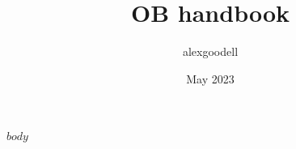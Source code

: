 \documentclass[twoside,8pt]{extarticle}
\title{OB handbook}
\author{alexgoodell }
\date{May 2023}
\begin{document}
$body$
\end{document}
